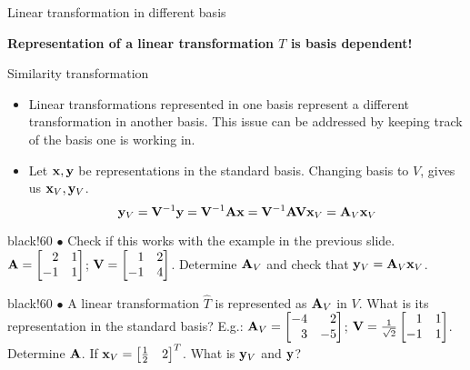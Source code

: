 \documentclass[aspectratio=169]{beamer}
\def\mf{\ensuremath\mathbf}
\def\bmx{\ensuremath\begin{bmatrix*}[r]}
\def\emx{\ensuremath\end{bmatrix*}}
\newcommand{\demoex}[2]{\onslide<#1->\begin{color}{black!60} #2 \end{color}}
\begin{document}
\begin{frame}[t]{Linear transformation in different basis}
\begin{small}
\textbf{Representation of a linear transformation $T$ is basis dependent! }
\end{small}

\end{frame}


\begin{frame}[t]{Similarity transformation}
\begin{itemize}
    \item Linear transformations represented in one basis represent a different transformation in another basis. This issue can be addressed by keeping track of the basis one is working in.

    \item Let $\mf{x}, \mf{y}$ be representations in the standard basis. Changing basis to $V$, gives us $\mf{x}_V, \mf{y}_V$.
    \[ \mf{y}_V = \mf{V}^{-1}\mf{y} = \mf{V}^{-1}\mf{Ax} = \mf{V}^{-1}\mf{A}\mf{V}\mf{x}_V = \mf{A}_V\mf{x}_V \]
\end{itemize}

\begin{small}
\demoex{2}{
    $\bullet$ Check if this works with the example in the previous slide. $\mf{A} = \begin{bmatrix*}[r]2 & 1\\-1 & 1\end{bmatrix*}$; $\mf{V} = \begin{bmatrix*}[r]1 & 2\\-1 & 4\end{bmatrix*}$. Determine $\mf{A}_V$ and check that $\mf{y}_V = \mf{A}_V\mf{x}_V$.
}\vspace{0.3cm}

\demoex{3}{
    $\bullet$ A linear transformation $\hat{T}$ is represented as $\mf{A}_V$ in $V$. What is its representation in the standard basis? E.g.: $\mf{A}_V = \begin{bmatrix*}[r]-4 & 2\\3 & -5\end{bmatrix*}$; $\mf{V} = \frac{1}{\sqrt{2}}\begin{bmatrix*}[r]1 & 1\\-1 & 1\end{bmatrix*}$. Determine $\mf{A}$. If $\mf{x}_V = \bmx \frac{1}{2} & 2\emx^T$. What is $\mf{y}_V$ and $\mf{y}$?
}
\end{small}
\end{frame}
\end{document}
